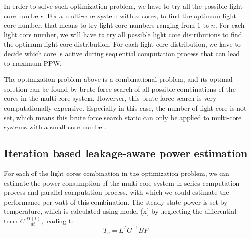 In order to solve such optimization problem, we have to try all the possible light core numbers. For a multi-core system with $n$ cores, to find the optimum light core number, that means to try light core numbers ranging from $1$ to $n$. For each light core number, we will have to try all possible light core distributions to find the optimum light core distribution. For each light core distribution, we have to decide which core is active during sequential computation process that can lead to maximum PPW. 

The optimization problem above is a combinational problem, and its optimal solution can be found by brute force search of all possible combinations of the cores in the multi-core system. Howerver, this brute force search is very computationally expensive. Especially in this case, the number of light core is not set, which means this brute force search static can only be applied to multi-core systems with a small core number. 

\subsection{Iteration based leakage-aware power estimation}
For each of the light cores combination in the optimization problem, we can estimate the power consumption of the multi-core system in series computation process and parallel computation process, with which we could estimate the performance-per-watt of this combination. The steady state power is set by temperature, which is calculated using model (x) by neglecting the differential term $C\frac{dT(t)}{dt}$, leading to
\begin{equation}\label{steady_state_temperature}
T_{c} = L^{T}G^{-1}BP
\end{equation}

